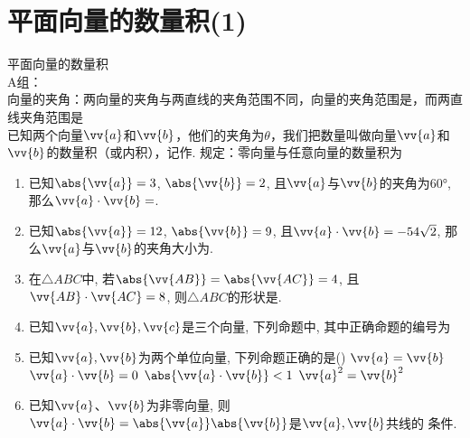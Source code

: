 \section*{平面向量的数量积(1)}
\zsd 平面向量的数量积 \\
A组：\\
向量的夹角：两向量的夹角与两直线的夹角范围不同，向量的夹角范围是\blkda{$[0, \pi]$}，而两直线夹角范围是\\
已知两个向量$\vv{a}$和$\vv{b}$，他们的夹角为$\theta$，我们把数量叫做向量$\vv{a}$和$\vv{b}$的数量积（或内积），记作. 规定：零向量与任意向量的数量积为
\begin{enumerate}
    \item 已知$\abs{\vv{a}}=3$, $\abs{\vv{b}}=2$, 且$\vv{a}$与$\vv{b}$的夹角为$\ang{60}$, 那么$\vv{a}\cdot\vv{b}=$. 
    
    \item 已知$\abs{\vv{a}}=12$, $\abs{\vv{b}}=9$, 且$\vv{a}\cdot\vv{b}=-54\sqrt{2}$, 那么$\vv{a}$与$\vv{b}$的夹角大小为. 
    
    \item 在$\triangle{ABC}$中, 若$\abs{\vv{AB}}=\abs{\vv{AC}}=4$, 且$\vv{AB}\cdot\vv{AC}=8$, 则$\triangle{ABC}$的形状是. 

    \item 已知$\vv{a},\vv{b},\vv{c}$是三个向量, 下列命题中, 其中正确命题的编号为
    \begin{jieda}
    \end{jieda}
    \item 已知$\vv{a},\vv{b}$为两个单位向量, 下列命题正确的是\dotfill()
    \xx
    {$\vv{a}=\vv{b}$}
    {$\vv{a}\cdot\vv{b}=0$}
    {$\abs{\vv{a}\cdot\vv{b}}<1$}
    {$\vv{a}^2=\vv{b}^2$}
    \item 已知$\vv{a}$、$\vv{b}$为非零向量, 则$\vv{a}\cdot\vv{b}=\abs{\vv{a}}\abs{\vv{b}}$是$\vv{a},\vv{b}$共线的 条件.
\end{enumerate}
